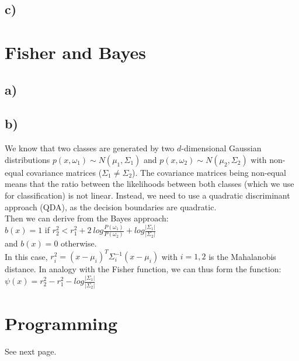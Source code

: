 \documentclass{article}
\begin{document}
\subsection*{c)}


\section{Fisher and Bayes}

\subsection*{a)}

\subsection{b)}

We know that two classes are generated by two $d$-dimensional Gaussian distributions $p(x, \omega_1 ) \sim N (\mu_1 , \Sigma_1 )$ and $p(x, \omega_2 ) \sim N (\mu_2 , \Sigma_2 )$ with non-equal covariance matrices ($\Sigma_1 \neq \Sigma_2$).
The covariance matrices being non-equal means that the ratio between the likelihoods between both classes (which we use for classification) is not linear. Instead, we need to use a quadratic discriminant approach (QDA), as the decision boundaries are quadratic. \\ 

Then we can derive from the Bayes approach: \\ 
$b(x) = 1$ if $r_2^2 < r_1^2 + 2\ log \frac{P (\omega_1)}{P(\omega_2)} + log \frac{|\Sigma_1|}{|\Sigma_2|}$ \\
and $b(x) = 0$ otherwise. \\

In this case, $r_i^2 = (x − \mu_i )^T \Sigma_i^{−1} (x − \mu_i )$ with $i = 1, 2$ is the Mahalanobis distance. 
In analogy with the Fisher function, we can thus form the function: \\
$\psi (x) = r_2^2 - r_1^2 - log \frac{|\Sigma_1|}{|\Sigma_2|}$



\section{Programming}

See next page.

%

%

\end{document}
